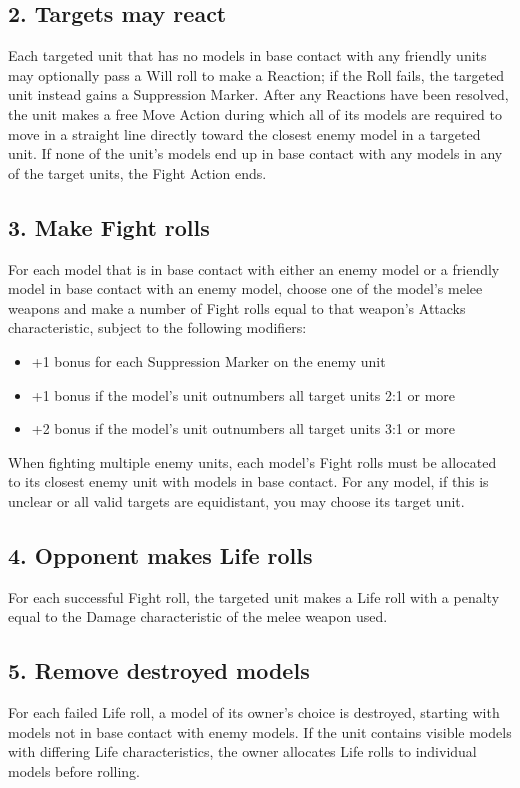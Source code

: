 \begin{multicols}{2}
\subsection*{2. Targets may react}
Each targeted unit that has no models in base contact with any friendly units may optionally pass a Will roll to make a Reaction; if the Roll fails, the targeted unit instead gains a Suppression Marker. After any Reactions have been resolved, the unit makes a free Move Action during which all of its models are required to move in a straight line directly toward the closest enemy model in a targeted unit. If none of the unit's models end up in base contact with any models in any of the target units, the Fight Action ends.

\subsection*{3. Make Fight rolls}
For each model that is in base contact with either an enemy model or a friendly model in base contact with an enemy model, choose one of the model's melee weapons and make a number of Fight rolls equal to that weapon's Attacks characteristic, subject to the following modifiers:

\begin{itemize}
    \item +1 bonus for each Suppression Marker on the enemy unit
    \item +1 bonus if the model's unit outnumbers all target units 2:1 or more
    \item +2 bonus if the model's unit outnumbers all target units 3:1 or more
\end{itemize}

When fighting multiple enemy units, each model's Fight rolls must be allocated to its closest enemy unit with models in base contact. For any model, if this is unclear or all valid targets are equidistant, you may choose its target unit.

\subsection*{4. Opponent makes Life rolls}
For each successful Fight roll, the targeted unit makes a Life roll with a penalty equal to the Damage characteristic of the melee weapon used.

\subsection*{5. Remove destroyed models}
For each failed Life roll, a model of its owner's choice is destroyed, starting with models not in base contact with enemy models. If the unit contains visible models with differing Life characteristics, the owner allocates Life rolls to individual models before rolling.





\end{multicols}

